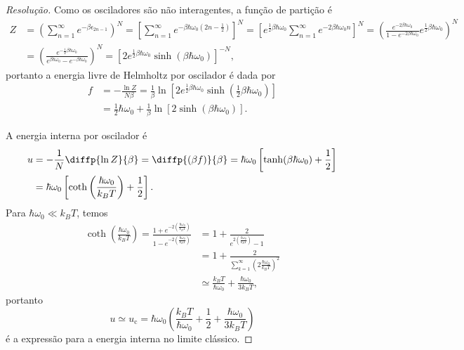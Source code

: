 \begin{proof}[Resolução]
    Como os osciladores são não interagentes, a função de partição é
    \begin{align*}
        Z &= \left(\sum_{n = 1}^\infty e^{-\beta\epsilon_{2n-1}}\right)^N = \left[\sum_{n=1}^\infty e^{-\beta \hbar \omega_0\left(2n - \frac12\right)}\right]^N = \left[e^{\frac12\beta \hbar \omega_0} \sum_{n=1}^\infty e^{-2\beta \hbar \omega_0 n}\right]^N = \left(\frac{e^{- 2\beta \hbar \omega_0}}{1 - e^{-2\beta \hbar \omega_0}} e^{\frac12 \beta \hbar \omega_0}\right)^N\\
          &= \left(\frac{e^{-\frac12\beta \hbar \omega_0}}{e^{\beta \hbar \omega_0} - e^{-\beta \hbar \omega_0}}\right)^N = \left[2e^{\frac12 \beta \hbar \omega_0}\sinh\left(\beta\hbar \omega_0\right)\right]^{-N},
    \end{align*}
    portanto a energia livre de Helmholtz por oscilador é dada por
    \begin{align*}
        f &= -\frac{\ln Z}{N \beta} = \frac{1}{\beta} \ln \left[2 e^{\frac12 \beta \hbar \omega_0}\sinh\left(\frac12\beta \hbar \omega_0\right)\right]\\
          &=  \frac 12 \hbar \omega_0 + \frac1\beta \ln\left[2\sinh(\beta \hbar \omega_0)\right].
    \end{align*}

    A energia interna por oscilador é
    \begin{align*}
        u &= -\frac1N \diffp{\ln Z}{\beta} = \diffp{(\beta f)}{\beta}= \hbar\omega_0\left[\tanh(\beta \hbar \omega_0)+\frac12 \right]\\
          &= \hbar \omega_0 \left[\coth\left(\frac{\hbar \omega_0}{k_B T}\right) + \frac12\right].
    \end{align*}
    Para \(\hbar \omega_0 \ll k_B T\), temos
    \begin{align*}
        \coth\left(\frac{\hbar \omega_0}{k_B T}\right) = \frac{1 + e^{-2\left(\frac{\hbar \omega_0}{k_B T}\right)}}{1 - e^{-2\left(\frac{\hbar \omega_0}{k_B T}\right)}}
                                                                 &= 1 + \frac2{e^{2\left(\frac{\hbar \omega_0}{k_B T}\right)} - 1}\\
                                                                 &= 1 + \frac2{\sum_{k = 1}^\infty \left(2\frac{\hbar \omega_0}{k_B T}\right)^2}\\
                                                                 &\simeq \frac{k_B T}{\hbar \omega_0} + \frac{\hbar \omega_0}{3k_B T},
    \end{align*}
    portanto
    \begin{equation*}
        u \simeq u_\mathrm{c} = \hbar \omega_0 \left(\frac{k_B T}{\hbar\omega_0} + \frac{1}{2} + \frac{\hbar \omega_0}{3 k_B T}\right)
    \end{equation*}
    é a expressão para a energia interna no limite clássico.


\end{proof}
